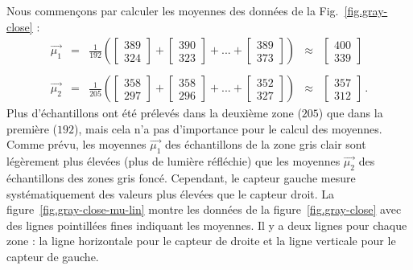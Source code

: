 Nous commençons par calculer les moyennes des données de la Fig.~\ref{fig.gray-close} :
\begin{displaymath}
\begin{array}{ccccc}
\vec{\mu_1} &=& {\displaystyle\frac{1}{192}} \left( \left[ \begin{array}{c} 389\\324 \end{array}\right] + \left[ \begin{array}{c} 390\\323 \end{array}\right] + ... + \left[ \begin{array}{c} 389\\373 \end{array}\right] \right)&\approx&\left[ \begin{array}{c} 400\\339 \end{array}\right]\\
\\
\vec{\mu_2} &=& {\displaystyle\frac{1}{205}} \left( \left[ \begin{array}{c} 358\\297 \end{array}\right] + \left[ \begin{array}{c} 358\\296 \end{array}\right] + ... + \left[ \begin{array}{c} 352\\327 \end{array}\right] \right)&\approx&\left[ \begin{array}{c} 357\\312 \end{array}\right]\,.
\end{array}
\end{displaymath}
Plus d'échantillons ont été prélevés dans la deuxième zone ($205$) que dans la première ($192$), mais cela n'a pas d'importance pour le calcul des moyennes. Comme prévu, les moyennes $\vec{\mu_1}$ des échantillons de la zone gris clair sont légèrement plus élevées (plus de lumière réfléchie) que les moyennes $\vec{\mu_2}$ des échantillons des zones gris foncé. Cependant, le capteur gauche mesure systématiquement des valeurs plus élevées que le capteur droit. La figure~\ref{fig.gray-close-mu-lin} montre les données de la figure~\ref{fig.gray-close} avec des lignes pointillées fines indiquant les moyennes. Il y a deux lignes pour chaque zone : la ligne horizontale pour le capteur de droite et la ligne verticale pour le capteur de gauche.

